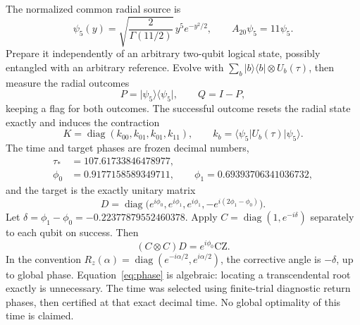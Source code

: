 \documentclass[11pt]{article}
\newcommand{\ket}[1]{\lvert#1\rangle}
\newcommand{\bra}[1]{\langle#1\rvert}
\newcommand{\CZ}{\mathrm{CZ}}
\begin{document}
The normalized common radial source is
\begin{equation}
 \psi_5(y)=\sqrt{\frac{2}{\Gamma(11/2)}}\,y^5e^{-y^2/2},
 \qquad A_{20}\psi_5=11\psi_5.\label{eq:source}
\end{equation}
Prepare it independently of an arbitrary two-qubit logical state, possibly entangled with an arbitrary reference.
Evolve with $\sum_b\ket b\bra b\otimes U_b(\tau)$, then measure the radial outcomes
\begin{equation}
 P=\ket{\psi_5}\bra{\psi_5},\qquad Q=I-P,
\end{equation}
keeping a flag for both outcomes.
The successful outcome resets the radial state exactly and induces the contraction
\begin{equation}
 K=\operatorname{diag}(k_{00},k_{01},k_{01},k_{11}),\qquad
 k_b=\bra{\psi_5}U_b(\tau)\ket{\psi_5}.\label{eq:K}
\end{equation}
The time and target phases are frozen decimal numbers,
\begin{align}
 \tau_*&=107.61733846478977,\label{eq:time}\\
 \phi_0&=0.9177158589349711,\qquad \phi_1=0.69393706341036732,\nonumber
\end{align}
and the target is the exactly unitary matrix
\begin{equation}
 D=\operatorname{diag}\bigl(e^{i\phi_0},e^{i\phi_1},e^{i\phi_1},
                         -e^{i(2\phi_1-\phi_0)}\bigr).\label{eq:D}
\end{equation}
Let $\delta=\phi_1-\phi_0=-0.22377879552460378$.
Apply $C=\operatorname{diag}(1,e^{-i\delta})$ separately to each qubit on success.
Then
\begin{equation}
 (C\otimes C)D=e^{i\phi_0}\CZ.\label{eq:phase}
\end{equation}
In the convention $R_z(\alpha)=\operatorname{diag}(e^{-i\alpha/2},e^{i\alpha/2})$, the corrective angle is $-\delta$, up to global phase.
Equation~\eqref{eq:phase} is algebraic: locating a transcendental root exactly is unnecessary.
The time was selected using finite-trial diagnostic return phases, then certified at that exact decimal time.
No global optimality of this time is claimed.
\end{document}
